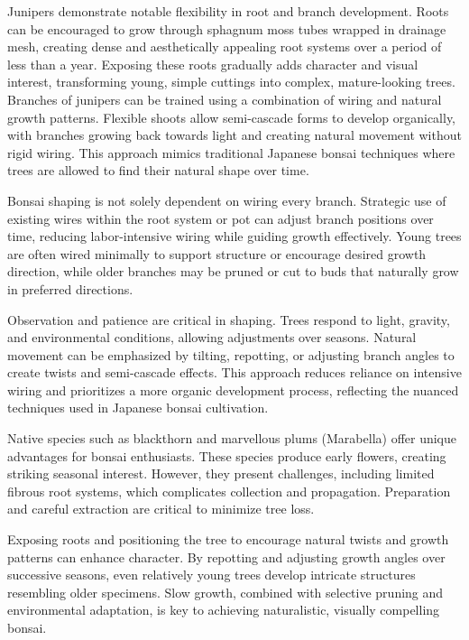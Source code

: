 Junipers demonstrate notable flexibility in root and branch development. Roots can be encouraged to grow through sphagnum moss tubes wrapped in drainage mesh, creating dense and aesthetically appealing root systems over a period of less than a year. Exposing these roots gradually adds character and visual interest, transforming young, simple cuttings into complex, mature-looking trees. Branches of junipers can be trained using a combination of wiring and natural growth patterns. Flexible shoots allow semi-cascade forms to develop organically, with branches growing back towards light and creating natural movement without rigid wiring. This approach mimics traditional Japanese bonsai techniques where trees are allowed to find their natural shape over time.

\medskip
{}
\noindent
Bonsai shaping is not solely dependent on wiring every branch. Strategic use of existing wires within the root system or pot can adjust branch positions over time, reducing labor-intensive wiring while guiding growth effectively. Young trees are often wired minimally to support structure or encourage desired growth direction, while older branches may be pruned or cut to buds that naturally grow in preferred directions.  

Observation and patience are critical in shaping. Trees respond to light, gravity, and environmental conditions, allowing adjustments over seasons. Natural movement can be emphasized by tilting, repotting, or adjusting branch angles to create twists and semi-cascade effects. This approach reduces reliance on intensive wiring and prioritizes a more organic development process, reflecting the nuanced techniques used in Japanese bonsai cultivation.

\medskip
{}
\noindent
Native species such as blackthorn and marvellous plums (Marabella) offer unique advantages for bonsai enthusiasts. These species produce early flowers, creating striking seasonal interest. However, they present challenges, including limited fibrous root systems, which complicates collection and propagation. Preparation and careful extraction are critical to minimize tree loss.  

Exposing roots and positioning the tree to encourage natural twists and growth patterns can enhance character. By repotting and adjusting growth angles over successive seasons, even relatively young trees develop intricate structures resembling older specimens. Slow growth, combined with selective pruning and environmental adaptation, is key to achieving naturalistic, visually compelling bonsai.

